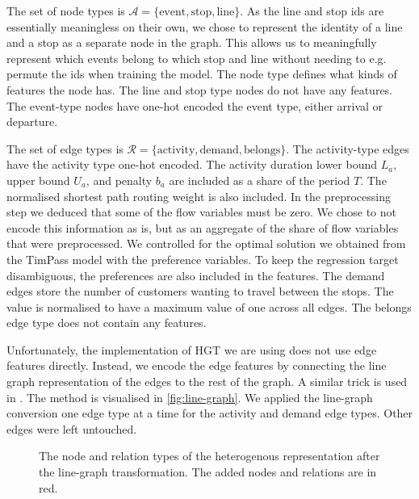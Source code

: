 \documentclass[english, 12pt, a4paper, sci, utf8, a-2b, online]{aaltothesis}
\begin{document}
The set of node types is $\mathcal{A} = \{\text{event}, \text{stop}, \text{line}\}$. As the line and stop ids are essentially meaningless on their own, we chose to represent the identity of a line and a stop as a separate node in the graph. This allows us to meaningfully represent which events belong to which stop and line without needing to e.g. permute the ids when training the model. The node type defines what kinds of features the node has. The line and stop type nodes do not have any features. The event-type nodes have one-hot encoded the event type, either arrival or departure.

The set of edge types is $\mathcal{R} = \{\text{activity}, \text{demand}, \text{belongs}\}$. The activity-type edges have the activity type one-hot encoded. The activity duration lower bound $L_a$, upper bound $U_a$, and penalty $b_a$ are included as a share of the period $T$. The normalised shortest path routing weight is also included. In the preprocessing step we deduced that some of the flow variables must be zero. We chose to not encode this information as is, but as an aggregate of the share of flow variables that were preprocessed. We controlled for the optimal solution we obtained from the TimPass model with the preference variables.
To keep the regression target disambiguous, the preferences are also included in the features.
The demand edges store the number of customers wanting to travel between the stops. The value is normalised to have a maximum value of one across all edges. The belongs edge type does not contain any features.

Unfortunately, the implementation of HGT we are using does not use edge features directly. Instead, we encode the edge features by connecting the line graph representation of the edges to the rest of the graph. A similar trick is used in \cite{line-graph-trick}. The method is visualised in \cref{fig:line-graph}. We applied the line-graph conversion one edge type at a time for the activity and demand edge types. Other edges were left untouched.


\begin{figure}[b]
    \centering
    
    \caption{The node and relation types of the heterogenous representation after the line-graph transformation. The added nodes and relations are in red.}
    \label{fig:hetero-relations}
\end{figure}
\end{document}

